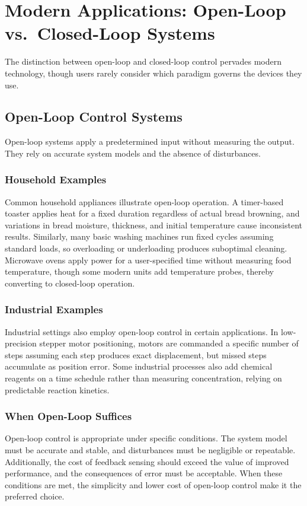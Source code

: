 \section{Modern Applications: Open-Loop vs.\ Closed-Loop Systems}
\label{sec:modern_applications}

The distinction between open-loop and closed-loop control pervades modern technology, though users rarely consider which paradigm governs the devices they use.

\subsection{Open-Loop Control Systems}

Open-loop systems apply a predetermined input without measuring the output. They rely on accurate system models and the absence of disturbances.

\subsubsection{Household Examples}
Common household appliances illustrate open-loop operation. A timer-based toaster applies heat for a fixed duration regardless of actual bread browning, and variations in bread moisture, thickness, and initial temperature cause inconsistent results. Similarly, many basic washing machines run fixed cycles assuming standard loads, so overloading or underloading produces suboptimal cleaning. Microwave ovens apply power for a user-specified time without measuring food temperature, though some modern units add temperature probes, thereby converting to closed-loop operation.

\subsubsection{Industrial Examples}
Industrial settings also employ open-loop control in certain applications. In low-precision stepper motor positioning, motors are commanded a specific number of steps assuming each step produces exact displacement, but missed steps accumulate as position error. Some industrial processes also add chemical reagents on a time schedule rather than measuring concentration, relying on predictable reaction kinetics.

\subsubsection{When Open-Loop Suffices}
Open-loop control is appropriate under specific conditions. The system model must be accurate and stable, and disturbances must be negligible or repeatable. Additionally, the cost of feedback sensing should exceed the value of improved performance, and the consequences of error must be acceptable. When these conditions are met, the simplicity and lower cost of open-loop control make it the preferred choice.

